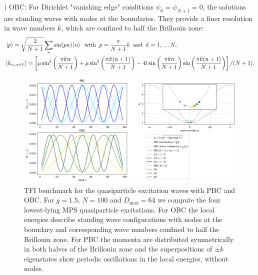 \vspace*{1em}
) OBC: For Dirichlet "vanishing edge" conditions $\psi_0 = \psi_{N+1} = 0$, the solutions are standing waves with nodes at the boundaries. They provide a finer resolution in wave numbers $k$, which are confined to half the Brillouin zone:
\begin{align*}
	& \ket{p} = \sqrt{\frac{2}{N+1}} \sum_n \sin(pn) \ket{n} \:\text{ with }\: p = \frac{\pi}{N+1} k \:\text{ and }\: k = 1, \ldots N, \\
	& \langle h_{n, n+1} \rangle 
	= \left[ 
	 \mu \sin^2 \left( \frac{\pi k n}{N+1} \right) 
	+ \mu \sin^2 \left(  \frac{\pi k (n+1)}{N+1} \right) 
	- 4t \sin \left( \frac{\pi k n}{N+1} \right) \sin \left( \frac{\pi k (n+1)}{N+1} \right)
	\right] / (N+1).
\end{align*}

\begin{figure}[H]
  \centering
  \includegraphics[width=1.0\linewidth]{excitations_local_energies.png}
  \caption{TFI benchmark for the quasiparticle excitation waves with PBC and OBC. For $g = 1.5$, $N = 100$ and $D_{\text{max}} = 64$ we compute the four lowest-lying MPS quasiparticle excitations. For OBC the local energies describe standing wave configurations with nodes at the boundary and corresponding wave numbers confined to half the Brillouin zone. For PBC the momenta are distributed symmetrically in both halves of the Brillouin zone and the superpositions of $\pm k$ eigenstates show periodic oscillations in the local energies, without nodes.}
 \label{fig:excitations_local_energies}
\end{figure}

